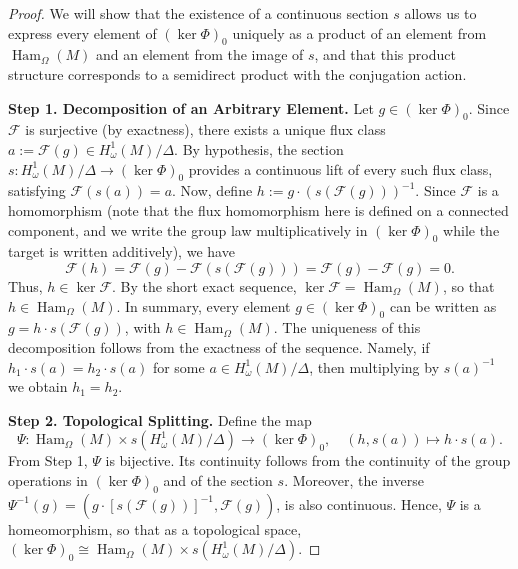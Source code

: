 \documentclass[11pt,a4paper]{amsart}
\theoremstyle{definition}
\theoremstyle{remark}
\newcommand{\Ham}{\operatorname{Ham}}
\begin{document}
	\begin{proof}
		We will show that the existence of a continuous section $s$ allows us to express every element of $(\ker \Phi)_0$ uniquely as a product of an element from $\Ham_\Omega(M)$ and an element from the image of $s$, and that this product structure corresponds to a semidirect product with the conjugation action.
		
		\textbf{Step 1. Decomposition of an Arbitrary Element.}
		Let $g \in (\ker \Phi)_0$. Since $\mathcal{F}$ is surjective (by exactness), there exists a unique flux class $a := \mathcal{F}(g) \in H_\omega^1(M)/\Delta$. By hypothesis, the section $s : H_\omega^1(M)/\Delta \to (\ker \Phi)_0$ provides a continuous lift of every such flux class, satisfying $\mathcal{F}(s(a)) = a$. Now, define $h := g \cdot (s(\mathcal{F}(g)))^{-1}$. Since $\mathcal{F}$ is a homomorphism (note that the flux homomorphism here is defined on a connected component, and we write the group law multiplicatively in $(\ker \Phi)_0$ while the target is written additively), we have
		\[
		\mathcal{F}(h) = \mathcal{F}(g) - \mathcal{F}(s(\mathcal{F}(g))) = \mathcal{F}(g) - \mathcal{F}(g) = 0.
		\]
		Thus, $h \in \ker \mathcal{F}$. By the short exact sequence, $\ker \mathcal{F} = \Ham_\Omega(M)$, so that $h \in \Ham_\Omega(M)$. In summary, every element $g \in (\ker \Phi)_0$ can be written as $g = h \cdot s(\mathcal{F}(g))$, with $h \in \Ham_\Omega(M)$. The uniqueness of this decomposition follows from the exactness of the sequence. Namely, if $h_1 \cdot s(a) = h_2 \cdot s(a)$ for some $a \in H_\omega^1(M)/\Delta$, then multiplying by $s(a)^{-1}$ we obtain $h_1 = h_2$.
		
		\textbf{Step 2. Topological Splitting.}
		Define the map
		\[
		\Psi : \Ham_\Omega(M) \times s\left(H_\omega^1(M)/\Delta\right) \to (\ker \Phi)_0, \quad (h, s(a)) \mapsto h \cdot s(a).
		\]
		From Step 1, $\Psi$ is bijective. Its continuity follows from the continuity of the group operations in $(\ker \Phi)_0$ and of the section $s$. Moreover, the inverse $\Psi^{-1}(g) = (g \cdot [s(\mathcal{F}(g))]^{-1}, \mathcal{F}(g))$, is also continuous. Hence, $\Psi$ is a homeomorphism, so that as a topological space, $(\ker \Phi)_0 \cong \Ham_\Omega(M) \times s(H_\omega^1(M)/\Delta)$.
		

\end{proof}
\end{document}
